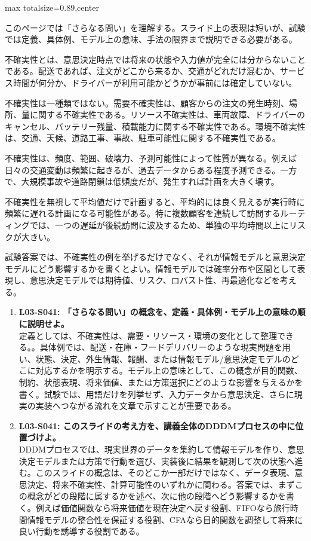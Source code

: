 \begin{minipage}[t]{0.58\textwidth}
\begin{adjustbox}{max totalsize={\textwidth}{0.89\textheight},center}
\begin{minipage}{\textwidth}\scriptsize
{}このページでは「さらなる問い」を理解する。スライド上の表現は短いが、試験では定義、具体例、モデル上の意味、手法の限界まで説明できる必要がある。\par
不確実性とは、意思決定時点では将来の状態や入力値が完全には分からないことである。配送であれば、注文がどこから来るか、交通がどれだけ混むか、サービス時間が何分か、ドライバーが利用可能かどうかが事前には確定していない。\par
不確実性は一種類ではない。需要不確実性は、顧客からの注文の発生時刻、場所、量に関する不確実性である。リソース不確実性は、車両故障、ドライバーのキャンセル、バッテリー残量、積載能力に関する不確実性である。環境不確実性は、交通、天候、道路工事、事故、駐車可能性に関する不確実性である。\par
不確実性は、頻度、範囲、破壊力、予測可能性によって性質が異なる。例えば日々の交通変動は頻繁に起きるが、過去データからある程度予測できる。一方で、大規模事故や道路閉鎖は低頻度だが、発生すれば計画を大きく壊す。\par
不確実性を無視して平均値だけで計画すると、平均的には良く見えるが実行時に頻繁に遅れる計画になる可能性がある。特に複数顧客を連続して訪問するルーティングでは、一つの遅延が後続訪問に波及するため、単独の平均時間以上にリスクが大きい。\par
試験答案では、不確実性の例を挙げるだけでなく、それが情報モデルと意思決定モデルにどう影響するかを書くとよい。情報モデルでは確率分布や区間として表現し、意思決定モデルでは期待値、リスク、ロバスト性、再最適化などを考える。\par{}\begin{enumerate}\item \textbf{L03-S041: 「さらなる問い」の概念を、定義・具体例・モデル上の意味の順に説明せよ。}\\定義としては、不確実性は、需要・リソース・環境の変化として整理できる。。具体例では、配送・在庫・フードデリバリーのような現実問題を用い、状態、決定、外生情報、報酬、または情報モデル/意思決定モデルのどこに対応するかを明示する。モデル上の意味として、この概念が目的関数、制約、状態表現、将来価値、または方策選択にどのような影響を与えるかを書く。試験では、用語だけを列挙せず、入力データから意思決定、さらに現実の実装へつながる流れを文章で示すことが重要である。\item \textbf{L03-S041: このスライドの考え方を、講義全体のDDDMプロセスの中に位置づけよ。}\\DDDMプロセスでは、現実世界のデータを集約して情報モデルを作り、意思決定モデルまたは方策で行動を選び、実装後に結果を観測して次の状態へ進む。このスライドの概念は、そのどこか一部だけではなく、データ表現、意思決定、将来不確実性、計算可能性のいずれかに関わる。答案では、まずこの概念がどの段階に属するかを述べ、次に他の段階へどう影響するかを書く。例えば価値関数なら将来価値を現在決定へ戻す役割、FIFOなら旅行時間情報モデルの整合性を保証する役割、CFAなら目的関数を調整して将来に良い行動を誘導する役割である。\end{enumerate}

\end{minipage}
\end{adjustbox}
\end{minipage}
